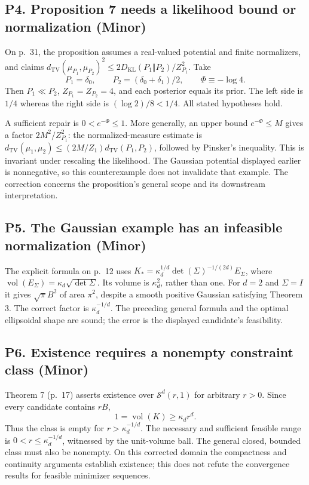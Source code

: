 \documentclass[10pt]{article}
\begin{document}
\subsection*{P4. Proposition 7 needs a likelihood bound or normalization (Minor)}
On p. 31, the proposition assumes a real-valued potential and finite normalizers, and claims \(d_{\mathrm{TV}}(\mu_{P_1},\mu_{P_2})^2\le2D_{\mathrm{KL}}(P_1\Vert P_2)/Z_{P_1}^2\). Take \[P_1=\delta_0,\qquad P_2=(\delta_0+\delta_1)/2,\qquad \Phi\equiv-\log4.\] Then \(P_1\ll P_2\), \(Z_{P_1}=Z_{P_2}=4\), and each posterior equals its prior. The left side is \(1/4\) whereas the right side is \((\log2)/8<1/4\). All stated hypotheses hold.\par
A sufficient repair is \(0<e^{-\Phi}\le1\). More generally, an upper bound \(e^{-\Phi}\le M\) gives a factor \(2M^2/Z_{P_1}^2\): the normalized-measure estimate is \(d_{\mathrm{TV}}(\mu_1,\mu_2)\le(2M/Z_1)d_{\mathrm{TV}}(P_1,P_2)\), followed by Pinsker’s inequality. This is invariant under rescaling the likelihood. The Gaussian potential displayed earlier is nonnegative, so this counterexample does not invalidate that example. The correction concerns the proposition’s general scope and its downstream interpretation.\par
\subsection*{P5. The Gaussian example has an infeasible normalization (Minor)}
The explicit formula on p. 12 uses \(K_*=\kappa_d^{1/d}\det(\Sigma)^{-1/(2d)}E_\Sigma\), where \(\operatorname{vol}(E_\Sigma)=\kappa_d\sqrt{\det\Sigma}\). Its volume is \(\kappa_d^2\), rather than one. For \(d=2\) and \(\Sigma=I\) it gives \(\sqrt\pi B^2\) of area \(\pi^2\), despite a smooth positive Gaussian satisfying Theorem 3. The correct factor is \(\kappa_d^{-1/d}\). The preceding general formula and the optimal ellipsoidal shape are sound; the error is the displayed candidate’s feasibility.\par
\subsection*{P6. Existence requires a nonempty constraint class (Minor)}
Theorem 7 (p. 17) asserts existence over \(\mathcal S^d(r,1)\) for arbitrary \(r>0\). Since every candidate contains \(rB\), \[1=\operatorname{vol}(K)\ge\kappa_dr^d .\] Thus the class is empty for \(r>\kappa_d^{-1/d}\). The necessary and sufficient feasible range is \(0<r\le\kappa_d^{-1/d}\), witnessed by the unit-volume ball. The general closed, bounded class must also be nonempty. On this corrected domain the compactness and continuity arguments establish existence; this does not refute the convergence results for feasible minimizer sequences.\par
\end{document}
